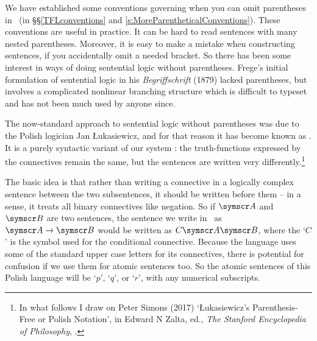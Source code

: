 We have established some conventions governing when you can omit parentheses in \TFL\ (in §§\ref{TFLconventions} and \ref{s:MoreParentheticalConventions}). These conventions are useful in practice. It can be hard to read sentences with many nested parentheses. Moreover, it is easy to make a mistake when constructing sentences, if you accidentally omit a needed bracket. So there has been some interest in ways of doing sentential logic without parentheses. Frege's initial formulation of sentential logic in his \emph{Begriffschrift} (1879) lacked parentheses, but involves a complicated nonlinear branching structure which is difficult to typeset and has not been much used by anyone since.

The now-standard approach to sentential logic without parentheses was due to the Polish logician Jan Łukasiewicz, and for that reason it has become known as . It is a purely syntactic variant of our system \TFL: the truth-functions expressed by the connectives remain the same, but the sentences are written very differently.\footnote{In what follows I draw on Peter Simons (2017) `Łukasiewicz's Parenthesis-Free or Polish Notation', in Edward N Zalta, ed., \emph{The Stanford Encyclopedia of Philosophy}, .}

The basic idea is that rather than writing a connective in a logically complex sentence between the two subsentences, it should be written before them – in a sense, it treats all binary connectives like negation. So if $\meta{A}$ and $\meta{B}$ are two sentences, the sentence we write in \TFL\ as $\meta{A} \eif \meta{B}$ would be written as $C\meta{A}\meta{B}$, where the `$C$' is the symbol used for the conditional connective. Because the language uses some of the standard upper case letters for its connectives, there is potential for confusion if we use them for atomic sentences too. So the atomic sentences of this Polish language will be `$p$', `$q$', or `$r$', with any numerical subscripts. 

